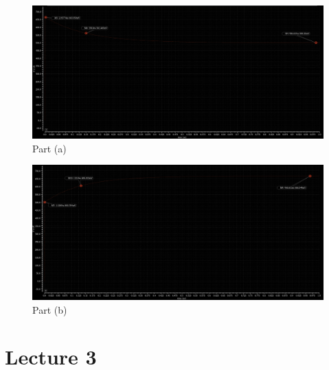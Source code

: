 \documentclass[a4paper]{article}
\begin{document}
\begin{figure}
    \centering
    \includegraphics[width=1\linewidth]{images/Lec_2_Q_2_a.png}
    \caption{Part (a)}
\end{figure}

\begin{figure}
    \centering
    \includegraphics[width=1\linewidth]{images/Lec_2_Q_2_b.png}
    \caption{Part (b)}
\end{figure}

\section{Lecture 3}
\end{document}
